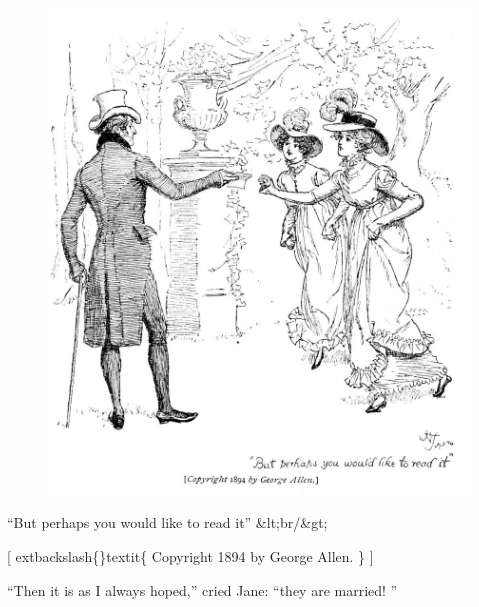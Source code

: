 \documentclass[10pt]{book}
\begin{document}
\begin{figure}[h]
\centering
\includegraphics[width=\linewidth]{images/i_399.jpg}
\end{figure}

      “But perhaps you would like to read it”
      &lt;br/&gt;

      [
      	extbackslash\{\}textit\{
       Copyright 1894 by George Allen.
      \}
      ]
     

    “Then it is as I always hoped,” cried Jane: “they are married!
    ”
   
\end{document}
